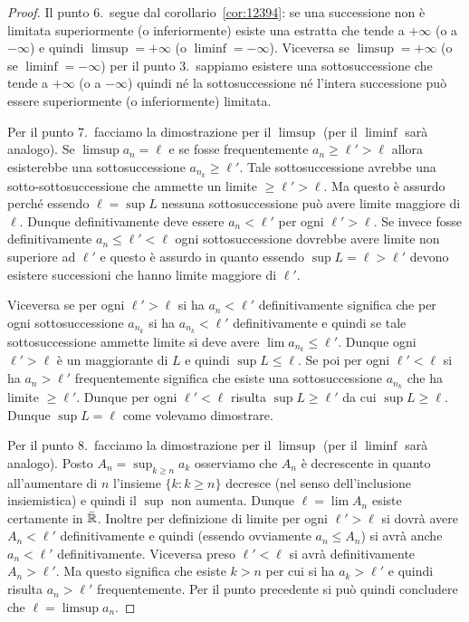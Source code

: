 \begin{proof}
  Il punto 6.\ segue dal corollario~\ref{cor:12394}: se una successione
  non è limitata superiormente (o inferiormente)
  esiste una estratta che tende a $+\infty$ (o a $-\infty$) e quindi
  $\limsup  = +\infty$ (o $\liminf = -\infty$).
  Viceversa se $\limsup = +\infty$ (o se $\liminf = -\infty$)
  per il punto 3.\ sappiamo esistere
  una sottosuccessione che tende a $+\infty$ (o a $-\infty$)
  quindi né la sottosuccessione
  né l'intera successione può essere superiormente (o inferiormente) limitata.

  Per il punto 7.\ facciamo la dimostrazione per il $\limsup$ (per il $\liminf$
  sarà analogo). Se $\limsup a_n = \ell$ e se fosse frequentemente
  $a_n \ge \ell' > \ell$ allora esisterebbe una sottosuccessione $a_{n_k}\ge \ell'$.
  Tale sottosuccessione avrebbe una sotto-sottosuccessione che ammette un limite
  $\ge \ell'> \ell$.
  Ma questo è assurdo perché essendo $\ell=\sup L$ nessuna sottosuccessione
  può avere limite maggiore di $\ell$.
  Dunque definitivamente deve essere $a_n < \ell'$ per ogni $\ell'>\ell$.
  Se invece fosse definitivamente $a_n \le \ell' < \ell$ ogni
  sottosuccessione dovrebbe avere limite non superiore ad $\ell'$
  e questo è assurdo in quanto essendo $\sup L = \ell > \ell'$
  devono esistere successioni che hanno limite maggiore di $\ell'$.

  Viceversa se per ogni $\ell'>\ell$ si ha $a_n<\ell'$ definitivamente
  significa che per ogni sottosuccessione $a_{n_k}$ si ha
  $a_{n_k} < \ell'$ definitivamente e quindi se tale sottosuccessione
  ammette limite si deve avere $\lim a_{n_k} \le \ell'$. Dunque
  ogni $\ell'>\ell$ è un maggiorante di $L$ e quindi $\sup L\le \ell$.
  Se poi per ogni $\ell'<\ell$ si ha $a_n>\ell'$ frequentemente
  significa che esiste una sottosuccessione $a_{n_k}$ che
  ha limite $\ge \ell'$. Dunque per ogni $\ell'<\ell$ risulta
  $\sup L \ge \ell'$ da cui $\sup L \ge \ell$. Dunque $\sup L=\ell$
  come volevamo dimostrare.

  Per il punto 8.\ facciamo la dimostrazione per il $\limsup$ (per il $\liminf$
  sarà analogo).
  Posto $A_n = \sup_{k\ge n} a_k$ osserviamo che $A_n$ è decrescente
  in quanto all'aumentare di $n$ l'insieme
  $\{k\colon k \ge n\}$ decresce (nel senso dell'inclusione insiemistica)
  e quindi
  il $\sup$ non aumenta.
  Dunque $\ell=\lim A_n$ esiste certamente in $\bar {\mathbb R}$.
  Inoltre per definizione di limite per ogni $\ell'>\ell$
  si dovrà avere $A_n < \ell'$ definitivamente e quindi
  (essendo ovviamente $a_n \le A_n$) si avrà
  anche $a_n < \ell'$ definitivamente.
  Viceversa preso $\ell'<\ell$ si avrà definitivamente
  $A_n > \ell'$. Ma questo significa che esiste $k>n$
  per cui si ha $a_k > \ell'$ e quindi
  risulta $a_n > \ell'$ frequentemente.
  Per il punto precedente si può quindi concludere che
  $\ell = \limsup a_n$.
\end{proof}


